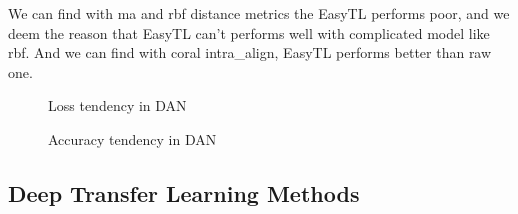 \documentclass[conference]{IEEEtran}
\begin{document}
We can find with ma and rbf distance metrics the EasyTL performs poor, and we deem the reason that EasyTL can't performs well with complicated model like rbf. And we can find with coral intra\_align, EasyTL performs better than raw one.

\begin{center}
	\begin{figure}
		\centering
		\quad
		\quad
		\caption{Loss tendency in DAN}
		\label{kFig4}
	\end{figure}
\end{center}

\begin{center}
	\begin{figure}
		\centering
		\caption{Accuracy tendency in DAN}
		\label{kFig5}
	\end{figure}
\end{center}

\subsection{Deep Transfer Learning Methods}
\end{document}

